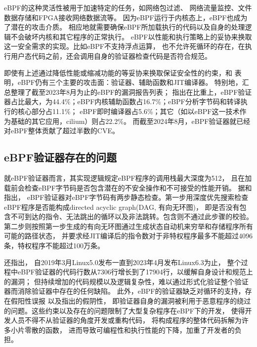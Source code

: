 \documentclass[12pt,a4paper]{article}
\begin{document}
\begin{sloppypar}
	eBPF的这种灵活性被用于加速特定的任务\cite{HaoValidating}，如网络包过滤\cite{10.1145/3371038,TCPdump}、
	网络流量监控\cite{9110434}、文件数据存储\cite{kernelStorage}和FPGA接收网络数据流\cite{258973}等。
	因为eBPF运行于内核态上，eBPF也成为了潜在的攻击介质\cite{LinuxEbpfProtection}。
	相应地就需要确保eBPF所加载执行的代码以及自身的处理逻辑不会破坏内核和其它程序的正常执行。
	eBPF以性能和执行策略上的妥协来换取这一安全需求的实现。比如eBPF不支持浮点运算\cite{10.1145/3674213.3674219}，
	也不允许死循环的存在\cite{riceLearningEBPFProgramming2023}，在执行用户态代码之前，还会调用自身的验证器检查代码是否符合规范。
	
	即使有上述通过降低性能或缩减功能的等妥协来换取保证安全性的约束，\textcite[62]{FuzzOnEBPF}和
	\textcite{mohamedUnderstandingSecurityLinux2023}表明，eBPF仍有三个主要的攻击面：验证器、辅助函数和JIT编译器。
	特别地，\textcite{mohamedUnderstandingSecurityLinux2023}汇总整理了截至2023年8月为止的eBPF的漏洞报告列表；
	指出在比重上，eBPF验证器占比最大，为44.4\%；eBPF内核辅助函数占16.7\%；eBPF分析字节码和转译执行的核心部分占11.1\%；
	eBPF即时编译器占5.6\%；其它（如以eBPF这一技术作为基础的其它应用，cilium）则占22.2\%。
	而截至2024年8月，eBPF验证器就已经对eBPF整体贡献了超过半数的CVE\cite{hive}。

	\subsection{eBPF验证器存在的问题}
	就eBPF验证器而言，其实现逻辑规定eBPF程序的调用栈最大深度为512\cite[30]{riceLearningEBPFProgramming2023}，
	且在加载前会检查eBPF字节码是否包含潜在的不安全操作和不可接受的性能开销\cite{PKSeBPFIsolation}。
	据\textcite{limSafeBPFHardwareassistedDefenseindepth2024}和\textcite[6]{vieiraFastPacketProcessing2021}指出，
	eBPF验证器对eBPF字节码有两步静态检查。第一步用深度优先搜索检查eBPF程序是否能构成directed acyclic graph(DAG, 有向无环图)，
	即是否没有包含不可到达的指令、无法跳出的循环以及非法跳转。包含则不通过此步骤的校验。
	第二步则按照第一步生成的有向无环图通过生成状态自动机来穷举和存储程序所有可能的路径状态，
	并要求经JIT编译后的指令数对于非特权程序最多不能超过4096条，特权程序不能超过100万条。
	
	\textcite[2]{limUnleashingUnprivilegedEBPF2023}还指出，
	自2019年3月Linux5.0发布一直到2023年4月发布Linux6.3为止，
	整个过程中eBPF验证器的代码行数从7306行增长到了17904行，以缓解自身设计和规范上的漏洞；
	但持续增加的代码规模以及逻辑复杂性，难以通过形式化验证整个验证器而消除验证器中存在的任何缺陷。
	此外，eBPF的验证器缺乏对循环的支持\cite{gershuniSimplePreciseStatic2019}，存在假阳性误报
	\cite{hive,gershuniSimplePreciseStatic2019}以及\textcite[2,5,6]{PKSeBPFIsolation}指出的假阴性，
	即验证器自身的漏洞被利用于恶意程序的绕过的问题。这些约束以及存在的问题限制了大型复杂程序在eBPF下的开发，
	使得开发人员不得不从验证器的角度开发\cite{PKSeBPFIsolation}或重构\cite{HaoValidating}代码，
	将构成程序的整体代码拆解为许多小片零散的函数\cite{AcceleratingMemcachedUsingSafeinKernCache}，
	进而导致可编程性和执行性能的下降\cite{kuoVerifiedProgramsCan2022}，加重了开发者的负担。


\end{sloppypar}
\end{document}
